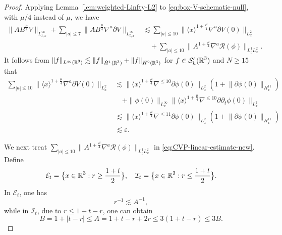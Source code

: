 \documentclass[11pt,twoside]{article}
\def\R{\mathop{\mathbb R\kern 0pt}\nolimits}
\def\ds{\displaystyle}
\def\f{\frac}
\def\p{\partial}
\def\ve{\varepsilon}
\def\ls{\lesssim}
\theoremstyle{plain}
\theoremstyle{definition}
\theoremstyle{assumption}
\numberwithin{equation}{section}
\begin{document}
	\begin{proof}
		Applying Lemma~\ref{lem:weighted-Linfty-L2} to \eqref{eq:box-V-schematic-null}, with \(\mu/4\)
		instead of \(\mu\), we have
		\begin{equation}
			\label{eq:CVP-linear-estimate-new}
			\begin{aligned}
				\|AB^{\frac{\mu}{4}}V\|_{L^\infty_{t,x}}
				+
				\sum_{|a|\le 7}
				\big\|
				AB^{\frac{\mu}{4}}
				\nabla^a\p V
				\big\|_{L^\infty_{t,x}}
				&\ls
				\sum_{|a|\le 10}
				\big\|
				\langle x\rangle^{1+\frac{\mu}{4}}
				\nabla^a
				\p V(0)
				\big\|_{L^2_x}
				\\
				&\quad+
				\sum_{|a|\le 10}
				\big\|
				A^{1+\frac{\mu}{4}}
				\nabla^a\mathcal R(\phi)
				\big\|_{L^1_tL^2_x}.
			\end{aligned}
		\end{equation}
	It follows from $\|f\|_{L^\infty(\R^3)}\ls\|f\|_{\dot{H}^1(\R^3)}+\|f\|_{\dot{H}^2(\R^3)}$ for $f\in \mathcal{S}'_h(\R^3)$
     and $N\ge 15$ that
		\begin{equation}
			\label{eq:CVP-initial-bound-new}
			\begin{aligned}
				\sum_{|a|\le 10}
				\big\|
				\langle x\rangle^{1+\frac{\mu}{4}}
				\nabla^a
				\p V(0)
				\big\|_{L^2_x}
				&\ls
				\big\|
				\langle x\rangle^{1+\frac{\mu}{4}}
				\nabla^{\le 10}
				\p \phi(0)
				\big\|_{L^2_x}
				(1+\big\|
				\p \phi(0)
				\big\|_{H^{11}_x})
				\\
				&\quad+\|\phi(0)\|_{L^\infty_x}
				\big\|
				\langle x\rangle^{1+\frac{\mu}{4}}
				\nabla^{\le 10}
				\p \p_t\phi(0)
				\big\|_{L^2_x}\\
				&\ls
				\big\|
				\langle x\rangle^{1+\frac{\mu}{4}}
				\nabla^{\le 11}
				\p \phi(0)
				\big\|_{L^2_x}
				(1+\big\|
				\p \phi(0)
				\big\|_{H^{11}_x})\\
				&\ls
				\ve.
			\end{aligned}
		\end{equation}
		
		We next treat $\ds\sum_{|a|\le 10}
				\big\|
				A^{1+\frac{\mu}{4}}
				\nabla^a\mathcal R(\phi)
				\big\|_{L^1_tL^2_x}$ in \eqref{eq:CVP-linear-estimate-new}. Define
		\begin{equation}
			\label{eq:CVP-exterior-and-interior-regions}
			\mathcal E_t=\big\{x\in\R^3:r\ge \f{1+t}{2}\big\}, \quad \mathcal I_t=\big\{x\in\R^3:r\le \f{1+t}{2}\big\}.
		\end{equation}
		In $\mathcal{E}_t$, one has
		\begin{equation}
			\label{eq:CVP-exterior-r}
			r^{-1}\ls A^{-1},
		\end{equation}
		while in $\mathcal{I}_t$, due to $r\le 1+t-r$, one can obtain
		\begin{equation}
			\label{eq:CVP-interior-B=A}
			B=1+|t-r|\le A = 1+t-r+2r\le 3(1+t-r)\le 3B.
		\end{equation}
		

\end{proof}
\end{document}
